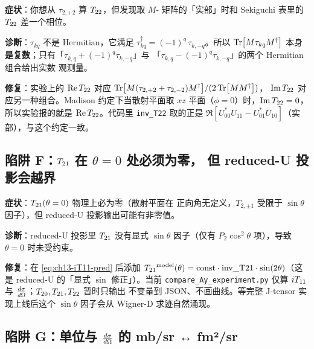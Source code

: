 \begin{pitfallbox}
\textbf{症状}：你想从 \(\tau_{2,+2}\) 算 \({T_{22}}\)，但发现取 \(M\)-
矩阵的「实部」时和 Sekiguchi 表里的 \({T_{22}}\) 差一个相位。

\textbf{诊断}：\(\tau_{kq}\) 不是 Hermitian，它满足
\(\tau_{kq}^\dagger = (-1)^{q}\,\tau_{k,-q}\)。所以 \(\Tr[M\tau_{kq}M^\dagger]\)
本身\textbf{是复数}；只有「\(\tau_{k,q} + (-1)^{q}\tau_{k,-q}\)」与
「\(\tau_{k,q} - (-1)^{q}\tau_{k,-q}\)」的两个 Hermitian 组合给出实数
观测量。

\textbf{修复}：实验上的 \(\Re\Ttwentytwo\) 对应
\(\Tr[M(\tau_{2,+2} + \tau_{2,-2})M^\dagger]/(2\Tr[MM^\dagger])\)，
\(\Im\Ttwentytwo\) 对应另一种组合。Madison 约定下当散射平面取
\(xz\) 平面（\(\phi=0\)）时，\(\Im\Ttwentytwo = 0\)，所以实验报的就是
\(\Re\Ttwentytwo\)。代码里 \texttt{inv\_T22} 取的正是
\(\Re[U_{00}^{*}U_{11} - U_{01}^{*}U_{10}]\)（实部），与这个约定一致。
\end{pitfallbox}

\subsection{陷阱 F：\({T_{21}}\) 在 \(\theta = 0\) 处必须为零，
但 reduced-U 投影会越界}
\label{subsec:ch13-pitfall-T21-at-zero}

\begin{pitfallbox}
\textbf{症状}：\({T_{21}}(\theta = 0)\) 物理上必为零（散射平面在
正向角无定义，\(T_{2,\pm 1}\) 受限于 \(\sin\theta\) 因子），但 reduced-U
投影输出可能有非零值。

\textbf{诊断}：reduced-U 投影里 \({T_{21}}\) 没有显式 \(\sin\theta\)
因子（仅有 \(P_2 \cos^2\theta\) 项），导致 \(\theta = 0\) 时未受约束。

\textbf{修复}：在 \cref{eq:ch13-iT11-pred} 后添加
\({T_{21}}^{\text{model}}(\theta) = \text{const} \cdot \text{inv\_T21}
\cdot \sin(2\theta)\)（这是 reduced-U 的「显式 \(\sin\) 修正」）。当前
\texttt{compare\_Ay\_experiment.py} 仅算 \({i T_{11}}\) 与
\(\frac{d\sigma}{d\Omega}\)；\({T_{20}}, {T_{21}}, {T_{22}}\) 暂时只输出
不变量到 JSON、不画曲线。等完整 J-tensor 实现上线后这个 \(\sin\theta\)
因子会从 Wigner-D 求迹自然涌现。
\end{pitfallbox}

\subsection{陷阱 G：单位与 \(\frac{d\sigma}{d\Omega}\) 的 mb/sr ↔ fm²/sr}
\label{subsec:ch13-pitfall-units}

